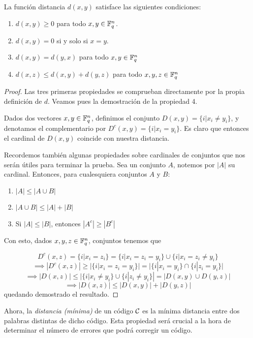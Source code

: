 \begin{proposition}
\label{prop:distance}
La función distancia \(d(x,y)\) satisface las siguientes condiciones:
\begin{enumerate}
    \item \(d(x,y) \geq 0\) para todo \(x, y \in \mathbb{F}_q^n\).
    \item \(d(x,y) = 0\) si y solo si \(x = y\).
    \item \(d(x,y) = d(y,x)\) para todo \(x,y \in \mathbb{F}_q^n\)
    \item \(d(x,z) \leq d(x,y) + d(y,z)\) para todo \(x, y, z \in \mathbb{F}_q^n\)
\end{enumerate}

\begin{proof}
Las tres primeras propiedades se comprueban directamente por la propia definición de \(d\). Veamos pues la demostración de la propiedad 4.

Dados dos vectores \(x, y \in \mathbb{F}_q^n\), definimos el conjunto \(D(x,y) = \{i | x_i \neq y_i\}\), y denotamos el complementario por \(D^c(x, y) = \{i | x_i = y_i\}\). Es claro que entonces el cardinal de \(D(x,y)\) coincide con nuestra distancia.

Recordemos también algunas propiedades sobre cardinales de conjuntos que nos serán útiles para terminar la prueba. Sea un conjunto \(A\), notemos por \(|A|\) su cardinal. Entonces, para cualesquiera conjuntos \(A\) y \(B\):
\begin{enumerate}
    \item \(|A| \leq |A \cup B|\)
    \item \(|A \cup B| \leq |A| + |B|\)
    \item Si \(|A| \leq |B|\), entonces \(|A^c| \geq |B^c|\)
\end{enumerate}
Con esto, dados \(x, y, z \in \mathbb{F}_q^n\), conjuntos tenemos que

\[
D^c(x,z) = \{i | x_i = z_i\} = \{i | x_i = z_i = y_i\} \cup \{i | x_i = z_i \neq y_i\}
\]
\[
\implies |D^c(x,z)| \geq |\{i | x_i = z_i = y_i\}| = |\{i | x_i = y_i\} \cap \{i | z_i = y_i\}|
\]
\[
\implies |D(x,z)| \leq |\{i | x_i \neq y_i\} \cup \{i | z_i \neq y_i\}| = |D(x,y) \cup D(y,z)|
\]
\[
\implies |D(x,z)| \leq |D(x,y)| + |D(y,z)|
\]
quedando demostrado el resultado.
\end{proof}
\end{proposition}

Ahora, la \textit{distancia (mínima)} de un código \(\mathcal{C}\) es la mínima distancia entre dos palabras distintas de dicho código. Esta propiedad será crucial a la hora de determinar el número de errores que podrá corregir un código.

